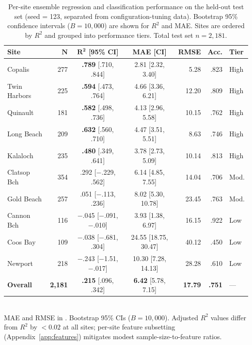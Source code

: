 \documentclass[toxins,article,submit,moreauthors]{Definitions/mdpi}
\begin{document}
\begin{table}[H]
\caption{Per-site ensemble regression and classification performance on the held-out test set (seed = 123, separated from configuration-tuning data). Bootstrap 95\% confidence intervals ($B = 10{,}000$) are shown for $R^2$ and MAE. Sites are ordered by $R^2$ and grouped into performance tiers. Total test set $n = 2{,}181$.}
\label{tab:per-site-results}
\centering\scriptsize
\begin{tabular*}{\linewidth}{@{\extracolsep{\fill}}lrccrrl}
\toprule
\textbf{Site} & $\boldsymbol{N}$ & $\boldsymbol{R^2}$ \textbf{[95\% CI]} & \textbf{MAE [CI]} & \textbf{RMSE} & \textbf{Acc.} & \textbf{Tier} \\
\midrule
Copalis       & 277 & \textbf{.789} [.710, .844] & 2.81 [2.32, 3.40] & 5.28  & .823 & High \\
Twin Harbors  & 225 & \textbf{.594} [.473, .764] & 4.66 [3.36, 6.21] & 12.20 & .809 & High \\
Quinault      & 181 & \textbf{.582} [.498, .736] & 4.13 [2.96, 5.58] & 10.15 & .762 & High \\
Long Beach    & 209 & \textbf{.632} [.560, .710] & 4.47 [3.51, 5.51] & 8.63  & .746 & High \\
Kalaloch      & 235 & \textbf{.480} [.349, .641] & 3.78 [2.73, 5.09] & 10.14 & .813 & High \\
\addlinespace
Clatsop Bch   & 354 & .292 [$-$.229, .562] & 6.14 [4.85, 7.55] & 14.04 & .706 & Mod. \\
Gold Beach    & 257 & .051 [$-$.113, .236] & 8.02 [5.30, 10.78] & 23.45 & .763 & Mod. \\
\addlinespace
Cannon Bch    & 116 & $-$.045 [$-$.091, $-$.010] & 3.93 [1.38, 6.97] & 16.15 & .922 & Low \\
Coos Bay      & 109 & $-$.038 [$-$.681, .304] & 24.55 [18.75, 30.47] & 40.12 & .450 & Low \\
Newport       & 218 & $-$.243 [$-$1.51, $-$.017] & 10.30 [7.28, 14.13] & 28.28 & .610 & Low \\
\midrule
\textbf{Overall} & \textbf{2,181} & \textbf{.215} [.096, .342] & \textbf{6.42} [5.78, 7.15] & \textbf{17.79} & \textbf{.751} & --- \\
\bottomrule
\end{tabular*}
\vspace{0.3em}\\
\footnotesize{MAE and RMSE in \si{\microgrampeg}. Bootstrap 95\% CIs ($B = 10{,}000$). Adjusted $R^2$ values differ from $R^2$ by $< 0.02$ at all sites; per-site feature subsetting (Appendix~\ref{app:features}) mitigates modest sample-size-to-feature ratios.}
\end{table}
\end{document}
